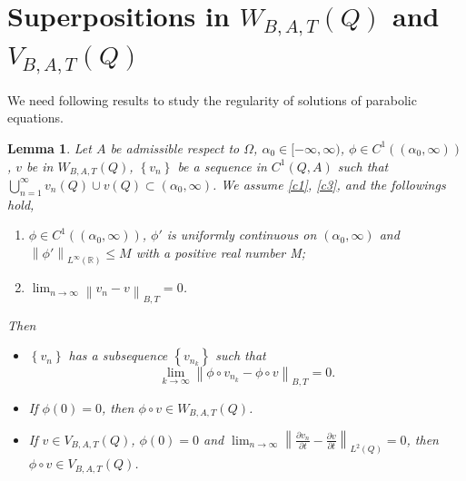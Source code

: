 \documentclass[11pt, a4paper]{article}
\newtheorem{lemma}[theorem]{Lemma}
\numberwithin{equation}{section}
\newcommand{\RR}{{\mathbb R}}
\newcommand{\norm}[1]{\left\lVert #1\right\rVert}
\begin{document}
 \section{Superpositions  in $W_{B,A,T}(Q)$ and $V_{B,A,T}(Q)$}\label{app}
We need  following results to study the regularity of solutions of parabolic equations.
\begin{lemma}
  Let $A$ be admissible respect to $\Omega$,
  $\alpha_0 \in [-\infty,\infty)$, $\phi\in C^{1}((\alpha_0,\infty))$, $v$
  be in $W_{B,A,T}(Q)$, $\left\{v_{n}\right\}$ be a sequence in
  $C^{1}(Q,A)$ such that
  $\bigcup_{n=1}^{\infty} v_{n}(Q)\cup v(Q) \subset
  (\alpha_0,\infty)$. We assume \eqref{c1}, \eqref{c3}, and the followings hold,
  \begin{enumerate}
  \item[$(a)$]
  $\phi\in C^{1}((\alpha_0,\infty))$, $\phi'$ is  uniformly continuous on $(\alpha_0,\infty)$ and 
  $\norm{\phi'}_{L^{\infty}(\RR)}\le M$  with  a positive real number
  M;
\item[$(b)$]
  $\lim_{n\to\infty}\norm{v_{n}-v}_{B,T}=0$.
  \end{enumerate}
  Then 
  \begin{itemize}
  \item[$(i)$] $\left\{v_{n}\right\}$ has a subsequence
  $\left\{v_{n_{k}}\right\}$ such that
  \begin{equation}
  \lim_{k\to\infty}\norm{\phi\circ v_{n_{k}}-\phi\circ v}_{B,T}=0.
   \label{2l51}
   \end{equation}
 \item[$(ii)$] If $\phi(0)=0$, then $\phi\circ v \in W_{B,A,T}(Q)$.
 \item[$(iii)$] If  $v\in V_{B,A,T}(Q)$, $\phi(0)=0$ and $\displaystyle\lim_{n\to\infty}\norm{\frac{\partial v_{n}}{\partial t} -\frac{\partial v}{\partial t}}_{L^{2}(Q)}=0$, then $\phi\circ v \in V_{B,A,T}(Q)$.
  \end{itemize} 
     \label{2w1ba}
\end{lemma}
\end{document}
